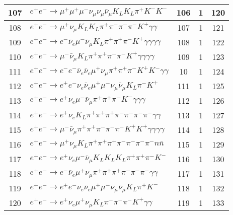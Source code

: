 \documentclass[landscape]{article}
\begin{document}
\begin{table}[htbp!]
\begin{tabular}{|c|>{\centering}p{18cm}|c|c|c|}
\hline
107 & $ e^{+} e^{-} \rightarrow \mu^{+} \mu^{+} \mu^{-} \nu_{\mu} \nu_{\mu} \bar{\nu}_{\mu} K_{L} K_{L} \pi^{+} K^{-} K^{-} $ & 106 & 1 & 120 \\
\hline
108 & $ e^{+} e^{-} \rightarrow \mu^{+} \nu_{\mu} K_{L} K_{L} \pi^{+} \pi^{-} \pi^{-} \pi^{-} K^{+} \gamma \gamma $ & 107 & 1 & 121 \\
\hline
109 & $ e^{+} e^{-} \rightarrow e^{-} \bar{\nu}_{e} \mu^{-} \bar{\nu}_{\mu} K_{L} \pi^{+} \pi^{+} \pi^{-} K^{+} \gamma \gamma \gamma \gamma $ & 108 & 1 & 122 \\
\hline
110 & $ e^{+} e^{-} \rightarrow \mu^{-} \bar{\nu}_{\mu} K_{L} \pi^{+} \pi^{+} \pi^{-} \pi^{-} K^{+} \gamma \gamma \gamma \gamma $ & 109 & 1 & 123 \\
\hline
111 & $ e^{+} e^{-} \rightarrow e^{-} e^{-} \bar{\nu}_{e} \bar{\nu}_{e} \mu^{+} \nu_{\mu} \pi^{+} \pi^{+} \pi^{-} K^{+} K^{-} \gamma \gamma $ & 10 & 1 & 124 \\
\hline
112 & $ e^{+} e^{-} \rightarrow e^{+} e^{-} \nu_{e} \bar{\nu}_{e} \mu^{+} \mu^{-} \nu_{\mu} \bar{\nu}_{\mu} K_{L} \pi^{-} K^{+} $ & 111 & 1 & 125 \\
\hline
113 & $ e^{+} e^{-} \rightarrow e^{+} \nu_{e} \mu^{-} \bar{\nu}_{\mu} \pi^{+} \pi^{+} \pi^{-} K^{-} \gamma \gamma \gamma $ & 112 & 1 & 126 \\
\hline
114 & $ e^{+} e^{-} \rightarrow e^{+} \nu_{e} K_{L} \pi^{+} \pi^{+} \pi^{+} \pi^{-} \pi^{-} \pi^{-} \pi^{-} \gamma \gamma $ & 113 & 1 & 127 \\
\hline
115 & $ e^{+} e^{-} \rightarrow \mu^{-} \bar{\nu}_{\mu} \pi^{+} \pi^{+} \pi^{-} \pi^{-} \pi^{-} K^{+} K^{+} \gamma \gamma \gamma \gamma $ & 114 & 1 & 128 \\
\hline
116 & $ e^{+} e^{-} \rightarrow \mu^{+} \nu_{\mu} K_{L} \pi^{+} \pi^{+} \pi^{+} \pi^{-} \pi^{-} \pi^{-} \pi^{-} n \bar{n} $ & 115 & 1 & 129 \\
\hline
117 & $ e^{+} e^{-} \rightarrow e^{+} \nu_{e} \mu^{-} \bar{\nu}_{\mu} K_{L} K_{L} K_{L} \pi^{+} \pi^{+} \pi^{-} K^{-} $ & 116 & 1 & 130 \\
\hline
118 & $ e^{+} e^{-} \rightarrow e^{-} \bar{\nu}_{e} \mu^{+} \nu_{\mu} \pi^{+} \pi^{+} \pi^{+} \pi^{-} \pi^{-} \pi^{-} \gamma \gamma $ & 117 & 1 & 131 \\
\hline
119 & $ e^{+} e^{-} \rightarrow e^{+} e^{-} \nu_{e} \bar{\nu}_{e} \mu^{+} \mu^{-} \nu_{\mu} \bar{\nu}_{\mu} K_{L} \pi^{+} K^{-} $ & 118 & 1 & 132 \\
\hline
120 & $ e^{+} e^{-} \rightarrow e^{+} \nu_{e} \mu^{+} \nu_{\mu} K_{L} \pi^{-} \pi^{-} \pi^{-} K^{+} \gamma \gamma $ & 119 & 1 & 133 \\
\hline
\end{tabular}
\end{table}
\end{document}
